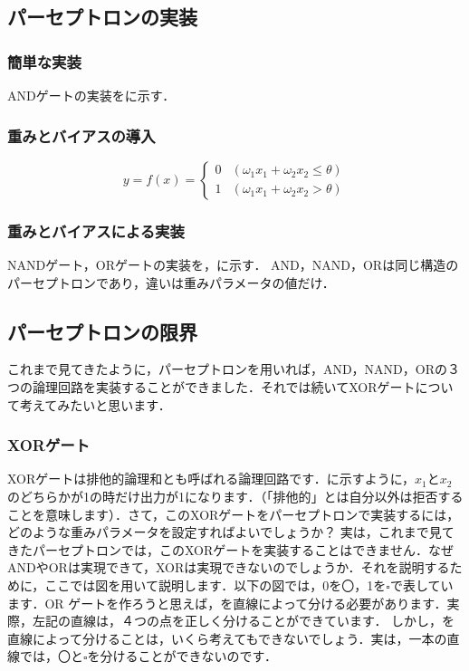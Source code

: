 \subsection{パーセプトロンの実装}
\subsubsection{簡単な実装}
ANDゲートの実装をに示す．

\subsubsection{重みとバイアスの導入}
\begin{equation}
    y=f(x) = \left\{
\begin{array}{ll}
0 & (\omega_1 x_1 + \omega_2 x_2 \le \theta)\\
1 & (\omega_1 x_1 + \omega_2 x_2 > \theta)
\end{array}
    \right.
\end{equation}

\subsubsection{重みとバイアスによる実装}
NANDゲート，ORゲートの実装を，に示す．
AND，NAND，ORは同じ構造のパーセプトロンであり，違いは重みパラメータの値だけ．

\subsection{パーセプトロンの限界}
これまで見てきたように，パーセプトロンを用いれば，AND，NAND，ORの３つの論理回路を実装することができました．それでは続いてXORゲートについて考えてみたいと思います．

\subsubsection{XORゲート}
XORゲートは排他的論理和とも呼ばれる論理回路です．に示すように，$x_1$と$x_2$のどちらかが1の時だけ出力が1になります．（「排他的」とは自分以外は拒否することを意味します）．さて，このXORゲートをパーセプトロンで実装するには，どのような重みパラメータを設定すればよいでしょうか？
実は，これまで見てきたパーセプトロンでは，このXORゲートを実装することはできません．なぜANDやORは実現できて，XORは実現できないのでしょうか．それを説明するために，ここでは図を用いて説明します．以下の図では，0を〇，1を$\square$で表しています．OR
ゲートを作ろうと思えば，を直線によって分ける必要があります．実際，左記の直線は，４つの点を正しく分けることができています．
しかし，を直線によって分けることは，いくら考えてもできないでしょう．実は，一本の直線では，〇と$\square$を分けることができないのです．


